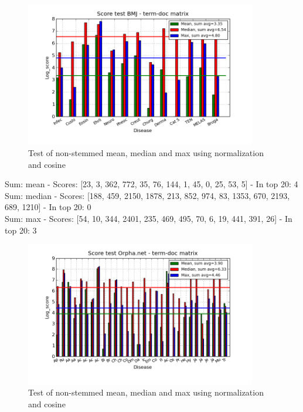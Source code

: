 \begin{figure}[h!]
        \begin{center}
          \includegraphics[width=0.9\textwidth]{barcharts/termDoc_bmj_hist_3000_sum_mea_med_max.png}
        \end{center}
        \caption{Test of non-stemmed mean, median and max using normalization and cosine}
        \label{termDoc_bmj_hist_3000_sum_mea_med_max}
\end{figure}
{\small
Sum: mean - Scores: [23, 3, 362, 772, 35, 76, 144, 1, 45, 0, 25, 53, 5] - In top 20: 4 \\
Sum: median - Scores: [188, 459, 2150, 1878, 213, 852, 974, 83, 1353, 670, 2193, 689, 1210] - In top 20: 0 \\
Sum: max - Scores: [54, 10, 344, 2401, 235, 469, 495, 70, 6, 19, 441, 391, 26] - In top 20: 3
}
\begin{figure}[h!]
        \begin{center}
          \includegraphics[width=0.9\textwidth]{barcharts/termDoc_orphan_hist_3000_ns_mea_med_max_sum.png}
        \end{center}
        \caption{Test of non-stemmed mean, median and max using normalization and cosine}
        \label{termDoc_orphan_hist_3000_ns_mea_med_max_sum}
\end{figure}
